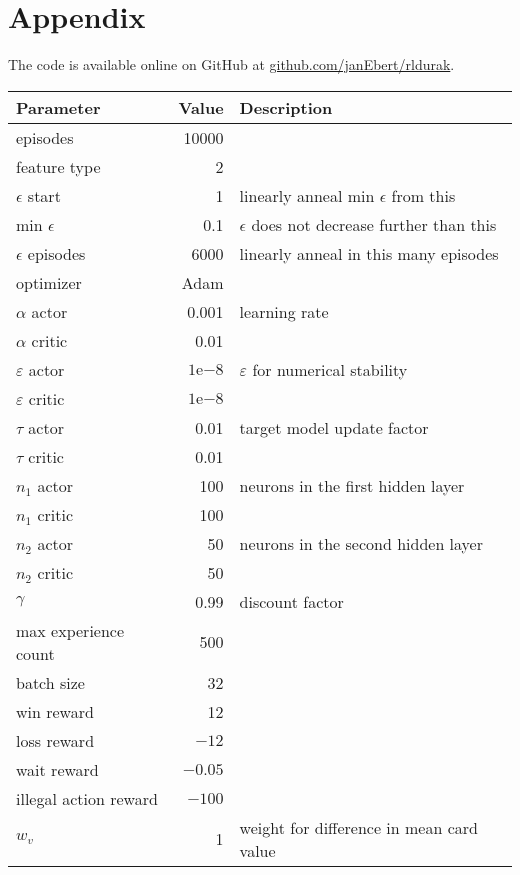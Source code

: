 \documentclass[a4paper,titlepage]{article}
\newcommand{\expn}[2]{{#1}\mathrm{e}{#2}}
\begin{document}
\newpage

\section{Appendix}
\label{sec:appendix}

The code is available online on GitHub at \url{github.com/janEbert/rldurak}. \bigskip

\begin{table}[h]
\centering
  \begin{tabular}{lrl}
    \toprule
    Parameter & Value & Description \\
    \midrule
    episodes & 10000 \\
    feature type & 2 \\
    $\epsilon$ start & 1 & linearly anneal min $\epsilon$ from this\\
    min $\epsilon$ & 0.1 & $\epsilon$ does not decrease further than this \\
    $\epsilon$ episodes & 6000 & linearly anneal in this many episodes \\
    optimizer & Adam \\
    $\alpha$ actor & 0.001 & learning rate \\
    $\alpha$ critic & 0.01 \\
    $\varepsilon$ actor & $\expn{1}{-8}$ & $\varepsilon$ for numerical stability \\
    $\varepsilon$ critic & $\expn{1}{-8}$ \\
    $\tau$ actor & 0.01 & target model update factor \\
    $\tau$ critic & 0.01 \\
    $n_1$ actor & 100 & neurons in the first hidden layer \\
    $n_1$ critic & 100 \\
    $n_2$ actor & 50 & neurons in the second hidden layer \\
    $n_2$ critic & 50 \\
    $\gamma$ & 0.99 & discount factor \\
    max experience count & 500 \\
    batch size & 32 \\
    win reward & 12 \\
    loss reward & ${-12}$ \\
    wait reward & $-0.05$ \\
    illegal action reward & $-100$ \\
    $w_v$ & 1 & weight for difference in mean card value \\

\end{tabular}
\end{table}
\end{document}
